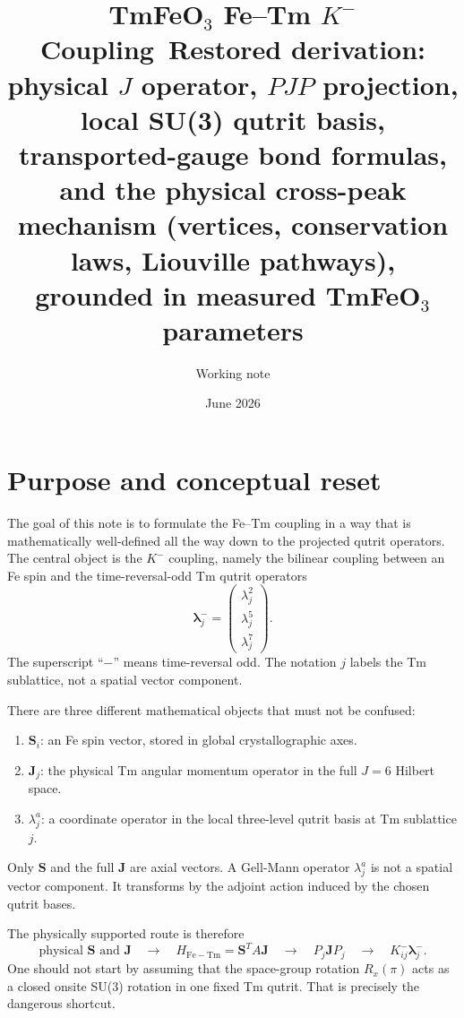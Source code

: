 \documentclass[11pt,a4paper]{article}
\title{\textbf{TmFeO$_3$ Fe--Tm $K^-$ Coupling}\
\large Restored derivation: physical $J$ operator, $PJP$ projection, local SU(3) qutrit basis, transported-gauge bond formulas, and the physical cross-peak mechanism (vertices, conservation laws, Liouville pathways), grounded in measured TmFeO$_3$ parameters}
\author{Working note}
\date{June 2026}
\newcommand{\Fe}{\mathrm{Fe}}
\newcommand{\Tm}{\mathrm{Tm}}
\newcommand{\ve}[1]{\boldsymbol{#1}}
\newcommand{\lvecminus}{\boldsymbol{\lambda}^{-}}
\begin{document}
\maketitle
\tableofcontents
\bigskip

\section{Purpose and conceptual reset}

The goal of this note is to formulate the Fe--Tm coupling in a way that is
mathematically well-defined all the way down to the projected qutrit operators.
The central object is the $K^-$ coupling, namely the bilinear coupling between
an Fe spin and the time-reversal-odd Tm qutrit operators
\begin{equation}
  \lvecminus_j =
  \begin{pmatrix}
    \lambda_j^2\\ \lambda_j^5\\ \lambda_j^7
  \end{pmatrix}.
\end{equation}
The superscript ``$-$'' means time-reversal odd.  The notation $j$ labels the
Tm sublattice, not a spatial vector component.

\begin{keybox}
There are three different mathematical objects that must not be confused:
\begin{enumerate}
  \item $\ve S_i$: an Fe spin vector, stored in global crystallographic axes.
  \item $\ve J_j$: the physical Tm angular momentum operator in the full $J=6$ Hilbert space.
  \item $\lambda_j^a$: a coordinate operator in the local three-level qutrit basis at Tm sublattice $j$.
\end{enumerate}
Only $\ve S$ and the full $\ve J$ are axial vectors.  A Gell-Mann operator $\lambda_j^a$ is not a spatial vector component.  It transforms by the adjoint action induced by the chosen qutrit bases.
\end{keybox}

The physically supported route is therefore
\begin{equation}
  \boxed{
  \text{physical }\ve S\text{ and }\ve J
  \quad\longrightarrow\quad
  H_{\Fe-\Tm}=\ve S^T A\ve J
  \quad\longrightarrow\quad
  P_j\ve J P_j
  \quad\longrightarrow\quad
  K^-_{ij}\lvecminus_j .}
\end{equation}
One should not start by assuming that the space-group rotation $R_x(\pi)$ acts as a closed onsite SU(3) rotation in one fixed Tm qutrit.  That is precisely the dangerous shortcut.
\end{document}
